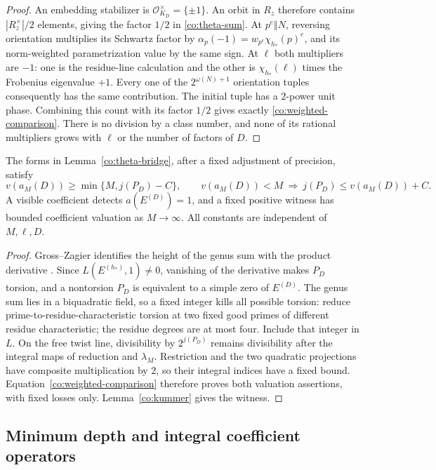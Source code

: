 \begin{proof}
An embedding stabilizer is $\mathcal O_{K_D}^\times=\{\pm1\}$.
An orbit in $R_z$ therefore contains $|R_z^\times|/2$ elements, giving
the factor $1/2$ in \eqref{co:theta-sum}.  At $p^e\Vert N$, reversing
orientation multiplies its Schwartz factor by
$\alpha_p(-1)=w_{p^e}\chi_{h_*}(p)^e$, and its norm-weighted
parametrization value by the same sign.  At $\ell$ both multipliers
are $-1$: one is the residue-line calculation and the other is
$\chi_{h_*}(\ell)$ times the Frobenius eigenvalue $+1$.
Every one of the $2^{\omega(N)+1}$ orientation tuples consequently
has the same contribution.  The initial tuple has a $2$-power unit
phase.  Combining this count with its factor $1/2$ gives exactly
\eqref{co:weighted-comparison}.  There is no division by a class
number, and none of its rational multipliers grows with $\ell$ or
the number of factors of $D$.
\end{proof}

\begin{proposition}\label{co:odd}
The forms in Lemma~\ref{co:theta-bridge}, after a fixed adjustment of
precision, satisfy
\[
 v(a_M(D))\geq\min\{M,j(P_D)-C\},\qquad
 v(a_M(D))<M\ \Longrightarrow\ j(P_D)\leq v(a_M(D))+C.
\]
A visible coefficient detects $a(E^{(D)})=1$, and a fixed positive
witness has bounded coefficient valuation as $M\to\infty$.
All constants are independent of $M,\ell,D$.
\end{proposition}

\begin{proof}
Gross--Zagier identifies the height of the genus sum with the product
derivative \cite{GrossZagier1986}.  Since $L(E^{(h_*)},1)\neq0$,
vanishing of the derivative makes $P_D$ torsion, and a nontorsion
$P_D$ is equivalent to a simple zero of $E^{(D)}$.
The genus sum lies in a biquadratic field, so a fixed integer kills
all possible torsion: reduce prime-to-residue-characteristic torsion
at two fixed good primes of different residue characteristic; the
residue degrees are at most four.  Include that integer in $L$.
On the free twist line, divisibility by $2^{j(P_D)}$ remains divisibility
after the integral maps of reduction and $\lambda_M$.
Restriction and the two quadratic projections have composite
multiplication by $2$, so their integral indices have a fixed bound.
Equation~\eqref{co:weighted-comparison} therefore proves both
valuation assertions, with fixed losses only.  Lemma~\ref{co:kummer}
gives the witness.
\end{proof}

\subsection{Minimum depth and integral coefficient operators}


